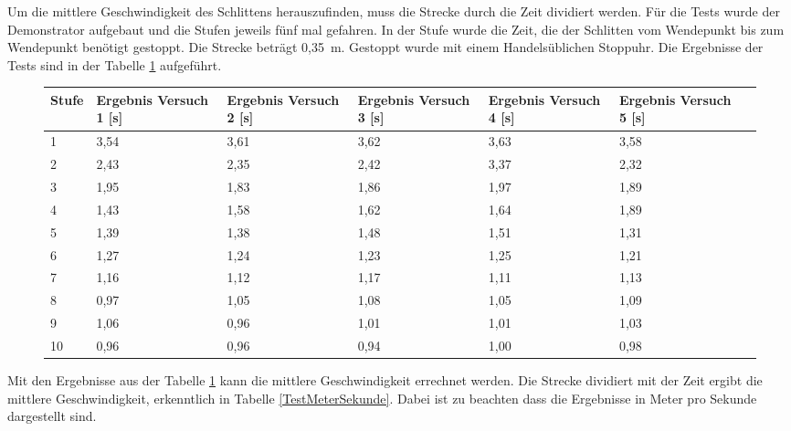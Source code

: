 Um die mittlere Geschwindigkeit des Schlittens herauszufinden, muss die Strecke durch die Zeit dividiert werden. Für die Tests wurde der Demonstrator aufgebaut und die Stufen jeweils fünf mal gefahren. In der Stufe wurde die Zeit, die der Schlitten vom Wendepunkt bis zum Wendepunkt benötigt gestoppt. Die Strecke beträgt 0,35\ m. Gestoppt wurde mit einem Handelsüblichen Stoppuhr. Die Ergebnisse der Tests sind in der Tabelle \ref{TestZeitTab} aufgeführt.

\begin{figure}[H]
\begin{center}
	\fontsize{8}{10}\selectfont
	\begin{tabularx}{\linewidth}{|p{0.8cm}|X|X|X|X|X|X|}
		\hline 
		\textbf{Stufe} & \textbf{Ergebnis Versuch 1 [s]} & \textbf{Ergebnis Versuch 2 [s]} & \textbf{Ergebnis Versuch 3 [s]}& \textbf{Ergebnis Versuch 4 [s]} & \textbf{Ergebnis Versuch 5 [s]} \\ \hline
		
		1 & 3,54 & 3,61 & 3,62 & 3,63 & 3,58 \\ \hline
		2 & 2,43 & 2,35 & 2,42 & 3,37 & 2,32 \\ \hline
		3 & 1,95 & 1,83 & 1,86 & 1,97 & 1,89 \\ \hline
		4 & 1,43 & 1,58 & 1,62 & 1,64 & 1,89 \\ \hline
		5 & 1,39 & 1,38 & 1,48 & 1,51 & 1,31 \\ \hline
		6 & 1,27 & 1,24 & 1,23 & 1,25 & 1,21 \\ \hline
		7 & 1,16 & 1,12 & 1,17 & 1,11 & 1,13 \\ \hline
		8 & 0,97 & 1,05 & 1,08 & 1,05 & 1,09 \\ \hline
		9 & 1,06 & 0,96 & 1,01 & 1,01 & 1,03 \\ \hline
		10 & 0,96 & 0,96 & 0,94 & 1,00 & 0,98 \\ \hline
		
		\end{tabularx}
			\label{TestZeitTab}
		\end{center}
\end{figure}

Mit den Ergebnisse aus der Tabelle \ref{TestZeitTab} kann die mittlere Geschwindigkeit errechnet werden. Die Strecke dividiert mit der Zeit ergibt die mittlere Geschwindigkeit, erkenntlich in Tabelle \ref{TestMeterSekunde}. Dabei ist zu beachten dass die Ergebnisse in Meter pro Sekunde dargestellt sind. 

